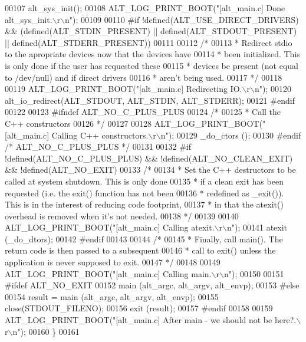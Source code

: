 \begin{DoxyCode}
00107   alt_sys_init();
00108   ALT_LOG_PRINT_BOOT(\textcolor{stringliteral}{"[alt\_main.c] Done alt\_sys\_init.\(\backslash\)r\(\backslash\)n"});
00109 
00110 \textcolor{preprocessor}{#if !defined(ALT\_USE\_DIRECT\_DRIVERS) && (defined(ALT\_STDIN\_PRESENT) || defined(ALT\_STDOUT\_PRESENT) ||
       defined(ALT\_STDERR\_PRESENT))}
00111 
00112   \textcolor{comment}{/*}
00113 \textcolor{comment}{   * Redirect stdio to the apropriate devices now that the devices have}
00114 \textcolor{comment}{   * been initialized. This is only done if the user has requested these}
00115 \textcolor{comment}{   * devices be present (not equal to /dev/null) and if direct drivers}
00116 \textcolor{comment}{   * aren't being used.}
00117 \textcolor{comment}{   */}
00118 
00119     ALT_LOG_PRINT_BOOT(\textcolor{stringliteral}{"[alt\_main.c] Redirecting IO.\(\backslash\)r\(\backslash\)n"});
00120     alt_io_redirect(ALT_STDOUT, ALT_STDIN, ALT_STDERR);
00121 \textcolor{preprocessor}{#endif}
00122 
00123 \textcolor{preprocessor}{#ifndef ALT\_NO\_C\_PLUS\_PLUS}
00124   \textcolor{comment}{/* }
00125 \textcolor{comment}{   * Call the C++ constructors }
00126 \textcolor{comment}{   */}
00127 
00128   ALT_LOG_PRINT_BOOT(\textcolor{stringliteral}{"[alt\_main.c] Calling C++ constructors.\(\backslash\)r\(\backslash\)n"});
00129   _do_ctors ();
00130 \textcolor{preprocessor}{#endif }\textcolor{comment}{/* ALT\_NO\_C\_PLUS\_PLUS */}\textcolor{preprocessor}{}
00131 
00132 \textcolor{preprocessor}{#if !defined(ALT\_NO\_C\_PLUS\_PLUS) && !defined(ALT\_NO\_CLEAN\_EXIT) && !defined(ALT\_NO\_EXIT)}
00133   \textcolor{comment}{/*}
00134 \textcolor{comment}{   * Set the C++ destructors to be called at system shutdown. This is only done}
00135 \textcolor{comment}{   * if a clean exit has been requested (i.e. the exit() function has not been}
00136 \textcolor{comment}{   * redefined as \_exit()). This is in the interest of reducing code footprint,}
00137 \textcolor{comment}{   * in that the atexit() overhead is removed when it's not needed.}
00138 \textcolor{comment}{   */}
00139 
00140   ALT_LOG_PRINT_BOOT(\textcolor{stringliteral}{"[alt\_main.c] Calling atexit.\(\backslash\)r\(\backslash\)n"});
00141   atexit (_do_dtors);
00142 \textcolor{preprocessor}{#endif}
00143 
00144   \textcolor{comment}{/*}
00145 \textcolor{comment}{   * Finally, call main(). The return code is then passed to a subsequent}
00146 \textcolor{comment}{   * call to exit() unless the application is never supposed to exit.}
00147 \textcolor{comment}{   */}
00148 
00149   ALT_LOG_PRINT_BOOT(\textcolor{stringliteral}{"[alt\_main.c] Calling main.\(\backslash\)r\(\backslash\)n"});
00150 
00151 \textcolor{preprocessor}{#ifdef ALT\_NO\_EXIT}
00152   main (alt_argc, alt_argv, alt_envp);
00153 \textcolor{preprocessor}{#else}
00154   result = main (alt_argc, alt_argv, alt_envp);
00155   close(STDOUT\_FILENO);
00156   exit (result);
00157 \textcolor{preprocessor}{#endif}
00158 
00159   ALT_LOG_PRINT_BOOT(\textcolor{stringliteral}{"[alt\_main.c] After main - we should not be here?.\(\backslash\)r\(\backslash\)n"});
00160 \}
00161 
\end{DoxyCode}

